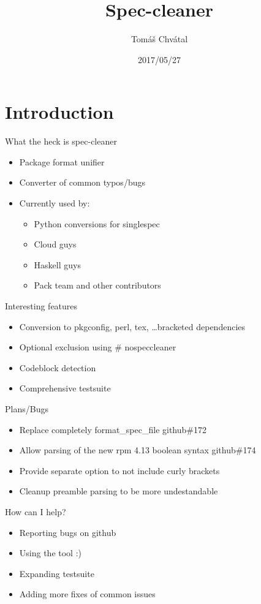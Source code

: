 \documentclass{beamer}
\author{Tom\'{a}\v{s} Chv\'{a}tal\newline {\small tchvatal@suse.com}\newline {\small Packaging/L3 - Packaging}}
\title{Spec-cleaner}
\date{2017/05/27}
\begin{document}
\begin{frame}[t,plain]
\titlepage
\end{frame}

\section{Introduction}

\begin{frame}[t]{What the heck is spec-cleaner}
	\begin{itemize}
	\item Package format unifier
	\item Converter of common typos/bugs
	\item Currently used by:
		\begin{itemize}
		\item Python conversions for singlespec
		\item Cloud guys
		\item Haskell guys
		\item Pack team and other contributors
		\end{itemize}
	\end{itemize}
\end{frame}

\begin{frame}[t]{Interesting features}
	\begin{itemize}
	\item Conversion to pkgconfig, perl, tex, \ldots bracketed dependencies
	\item Optional exclusion using \# nospeccleaner
	\item Codeblock detection
	\item Comprehensive testsuite
	\end{itemize}
\end{frame}

\begin{frame}[t]{Plans/Bugs}
	\begin{itemize}
	\item Replace completely format\_spec\_file github\#172
	\item Allow parsing of the new rpm 4.13 boolean syntax github\#174
	\item Provide separate option to not include curly brackets
	\item Cleanup preamble parsing to be more undestandable
	\end{itemize}
\end{frame}


\begin{frame}[t]{How can I help?}
	\begin{itemize}
	\item Reporting bugs on github
	\item Using the tool :)
	\item Expanding testsuite
	\item Adding more fixes of common issues
	\end{itemize}
\end{frame}
\end{document}
